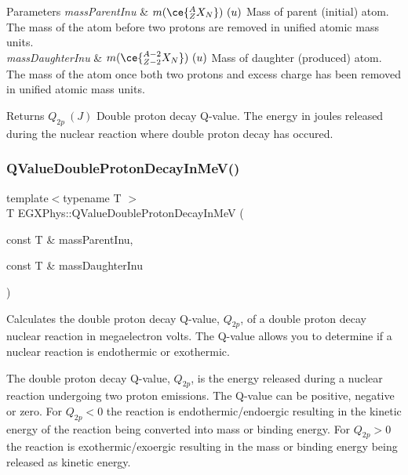 \begin{DoxyParams}{Parameters}
{\em mass\+Parent\+Inu} & $m(\ce{ ^{A}_{Z}X_{N} })\ (u)$ Mass of parent (initial) atom. The mass of the atom before two protons are removed in unified atomic mass units. \\
\hline
{\em mass\+Daughter\+Inu} & $m(\ce{ ^{A-2}_{Z-2}X_{N} })\ (u)$ Mass of daughter (produced) atom. The mass of the atom once both two protons and excess charge has been removed in unified atomic mass units. \\
\hline
\end{DoxyParams}
\begin{DoxyReturn}{Returns}
$Q_{2p}\ (J)$ Double proton decay Q-\/value. The energy in joules released during the nuclear reaction where double proton decay has occured. 
\end{DoxyReturn}
\mbox{\label{group___q_value_ga4a57c8901e92918f08bee52493b81c59}} 
\subsubsection{\texorpdfstring{Q\+Value\+Double\+Proton\+Decay\+In\+Me\+V()}{QValueDoubleProtonDecayInMeV()}}
{\footnotesize\ttfamily template$<$typename T $>$ \\
T E\+G\+X\+Phys\+::\+Q\+Value\+Double\+Proton\+Decay\+In\+MeV (\begin{DoxyParamCaption}\item[{const T \&}]{mass\+Parent\+Inu,  }\item[{const T \&}]{mass\+Daughter\+Inu }\end{DoxyParamCaption})}



Calculates the double proton decay Q-\/value, $Q_{2p}$, of a double proton decay nuclear reaction in megaelectron volts. The Q-\/value allows you to determine if a nuclear reaction is endothermic or exothermic. 

The double proton decay Q-\/value, $Q_{2p}$, is the energy released during a nuclear reaction undergoing two proton emissions. The Q-\/value can be positive, negative or zero. For $Q_{2p} < 0$ the reaction is endothermic/endoergic resulting in the kinetic energy of the reaction being converted into mass or binding energy. For $Q_{2p} > 0$ the reaction is exothermic/exoergic resulting in the mass or binding energy being released as kinetic energy.

